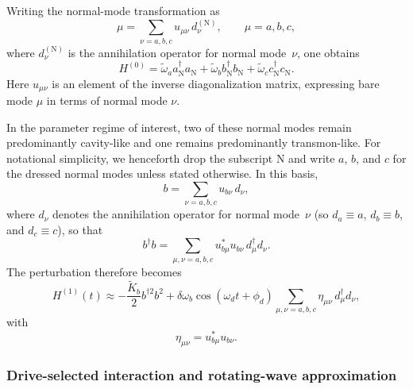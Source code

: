 Writing the normal-mode transformation as
\begin{equation}
    \mu
    =
    \sum_{\nu=a,b,c}
    u_{\mu\nu}\,d_\nu^{(\mathrm{N})},
    \qquad
    \mu=a,b,c,
\end{equation}
where \(d_\nu^{(\mathrm{N})}\) is the annihilation operator for normal mode~\(\nu\), one obtains
\begin{equation}
    H^{(0)}
    =
    \tilde\omega_a a_{\mathrm N}^\dagger a_{\mathrm N}
    +
    \tilde\omega_b b_{\mathrm N}^\dagger b_{\mathrm N}
    +
    \tilde\omega_c c_{\mathrm N}^\dagger c_{\mathrm N} .
    \label{eq:H0_diag}
\end{equation}
Here \(u_{\mu\nu}\) is an element of the inverse diagonalization matrix, expressing bare mode \(\mu\) in terms of normal mode \(\nu\).

In the parameter regime of interest, two of these normal modes remain predominantly cavity-like and one remains predominantly transmon-like. For notational simplicity, we henceforth drop the subscript \(\mathrm N\) and write \(a\), \(b\), and \(c\) for the dressed normal modes unless stated otherwise. In this basis,
\begin{equation}
    b
    =
    \sum_{\nu=a,b,c}
    u_{b\nu}\,d_\nu,
\end{equation}
where \(d_\nu\) denotes the annihilation operator for normal mode~\(\nu\) (so \(d_a\equiv a\), \(d_b\equiv b\), and \(d_c\equiv c\)), so that
\begin{equation}
    b^\dagger b
    =
    \sum_{\mu,\nu=a,b,c}
    u_{b\mu}^* u_{b\nu}\,
    d_\mu^\dagger d_\nu .
\end{equation}
The perturbation therefore becomes
\begin{equation}
    H^{(1)}(t)
    \approx
    -\frac{\tilde K_b}{2}b^{\dagger 2}b^2
    +
    \delta\omega_b \cos(\omega_d t+\phi_d)
    \sum_{\mu,\nu=a,b,c}
    \eta_{\mu\nu}\, d_\mu^\dagger d_\nu ,
    \label{eq:H1_normalmode}
\end{equation}
with
\begin{equation}
    \eta_{\mu\nu} = u_{b\mu}^* u_{b\nu}.
\end{equation}

\subsubsection{Drive-selected interaction and rotating-wave approximation}

